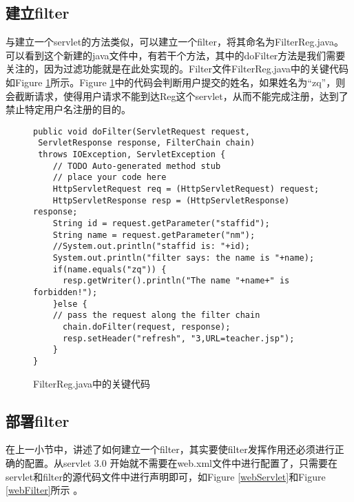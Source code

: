 \subsection{建立filter}
与建立一个servlet的方法类似，可以建立一个filter，将其命名为FilterReg.java。可以看到这个新建的java文件中，有若干个方法，其中的doFilter方法是我们需要关注的，因为过滤功能就是在此处实现的。Filter文件FilterReg.java中的关键代码如Figure \ref{filterReg}所示。Figure \ref{filterReg}中的代码会判断用户提交的姓名，如果姓名为“zq”，则会截断请求，使得用户请求不能到达Reg这个servlet，从而不能完成注册，达到了禁止特定用户名注册的目的。
\begin{figure}
\begin{lstlisting}
public void doFilter(ServletRequest request, 
 ServletResponse response, FilterChain chain)
 throws IOException, ServletException {
	// TODO Auto-generated method stub
	// place your code here
	HttpServletRequest req = (HttpServletRequest) request; 
	HttpServletResponse resp = (HttpServletResponse) response;
	String id = request.getParameter("staffid");
	String name = request.getParameter("nm");
	//System.out.println("staffid is: "+id);
	System.out.println("filter says: the name is "+name);
	if(name.equals("zq")) {
	  resp.getWriter().println("The name "+name+" is forbidden!");
	}else {
	// pass the request along the filter chain
	  chain.doFilter(request, response);
	  resp.setHeader("refresh", "3,URL=teacher.jsp");
	}
}
\end{lstlisting}
\caption{FilterReg.java中的关键代码}
\label{filterReg}
\end{figure}
\subsection{部署filter}
在上一小节中，讲述了如何建立一个filter，其实要使filter发挥作用还必须进行正确的配置。从servlet 3.0 开始就不需要在web.xml文件中进行配置了，只需要在servlet和filter的源代码文件中进行声明即可，如Figure \ref{webServlet}和Figure \ref{webFilter}所示 。

